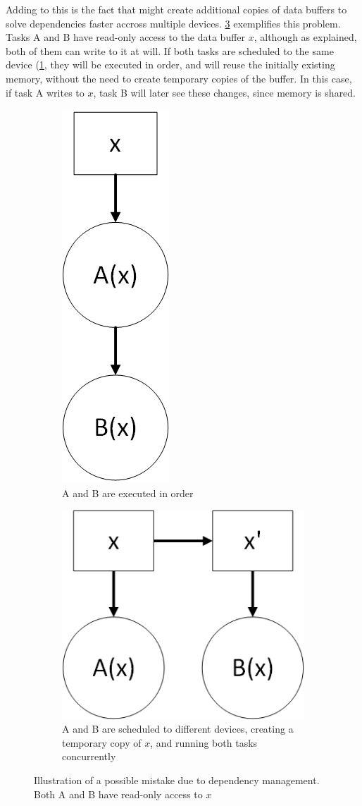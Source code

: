 \documentclass[main.tex]{subfiles}
\begin{document}
Adding to this is the fact that \starpu might create additional copies of data buffers to solve dependencies faster accross multiple devices. \cref{fig:deps_problem} exemplifies this problem. Tasks A and B have read-only access to the data buffer $x$, although as explained, both of them can write to it at will. If both tasks are scheduled to the same device (\cref{fig:deps_problem:a}, they will be executed in order, and \starpu will reuse the initially existing memory, without the need to create temporary copies of the buffer. In this case, if task A writes to $x$, task B will later see these changes, since memory is shared.


\begin{figure}[!htp]
  \centering
  \begin{subfigure}{.5\textwidth}
    \centering
    \includegraphics[width=0.2\linewidth]{visio/starpu_dep_rw}
    \caption{A and B are executed in order \label{fig:deps_problem:a}}
  \end{subfigure}%
  \begin{subfigure}{.5\textwidth}
    \centering
    \includegraphics[width=0.6\linewidth]{visio/starpu_dep_rw_caveat}
    \caption{A and B are scheduled to different devices, creating a temporary copy of $x$, and running both tasks concurrently \label{fig:deps_problem:b}}
  \end{subfigure}
  \caption{Illustration of a possible mistake due to dependency management. Both A and B have read-only access to $x$ \label{fig:deps_problem}}
\end{figure}
\end{document}
